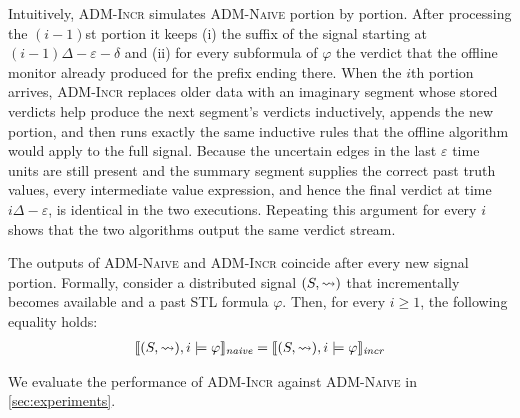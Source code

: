 Intuitively, \textsc{ADM-Incr} simulates \textsc{ADM-Naive} portion by portion.
After processing the $(i-1)$st portion it keeps (i) the suffix of the signal starting at $(i-1)\Delta - \varepsilon - \delta$ and (ii) for every subformula of $\varphi$ the verdict that the offline monitor already produced for the prefix ending there.
When the $i$th portion arrives, \textsc{ADM-Incr} replaces older data with an imaginary segment whose stored verdicts help produce the next segment's verdicts inductively, appends the new portion, and then runs exactly the same inductive rules that the offline algorithm would apply to the full signal.
Because the uncertain edges in the last $\varepsilon$ time units are still present and the summary segment supplies the correct past truth values, every intermediate value expression, and hence the final verdict at time $i\Delta - \varepsilon$, is identical in the two executions.
Repeating this argument for every $i$ shows that the two algorithms output the same verdict stream.

\begin{theorem} \label{cl:algoOnline}
	The outputs of \textsc{ADM-Naive} and \textsc{ADM-Incr} coincide after every new signal portion.
	Formally, consider a distributed signal $(S,{\rightsquigarrow})$ that incrementally becomes available and a past STL formula $\varphi$.
	Then, for every $i \geq 1$, the following equality holds:
	\begin{align*}
		\llbracket (S, {\rightsquigarrow}), i \models \varphi \rrbracket_{\textit{naive}} = \llbracket (S, {\rightsquigarrow}), i \models \varphi \rrbracket_{\textit{incr}}
	\end{align*}
\end{theorem}

We evaluate the performance of \textsc{ADM-Incr} against \textsc{ADM-Naive} in \cref{sec:experiments}.
\egroup





